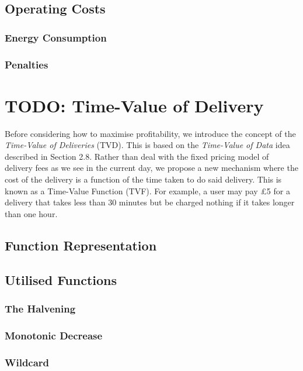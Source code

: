 \documentclass[a4paper,12pt,titlepage]{article}
\begin{document}
\subsection{Operating Costs}
\subsubsection{Energy Consumption}
\subsubsection{Penalties}

\newpage
\section{TODO: Time-Value of Delivery}
Before considering how to maximise profitability, we introduce the concept of the \textit{Time-Value of Deliveries} (TVD). This is based on the \textit{Time-Value of Data} idea described in Section 2.8. Rather than deal with the fixed pricing model of delivery fees as we see in the current day, we propose a new mechanism where the cost of the delivery is a function of the time taken to do said delivery. This is known as a Time-Value Function (TVF). For example, a user may pay £5 for a delivery that takes less than 30 minutes but be charged nothing if it takes longer than one hour.\\

\subsection{Function Representation}

\subsection{Utilised Functions}
\subsubsection{The Halvening}
\subsubsection{Monotonic Decrease}
\subsubsection{Wildcard}

\newpage
\end{document}
